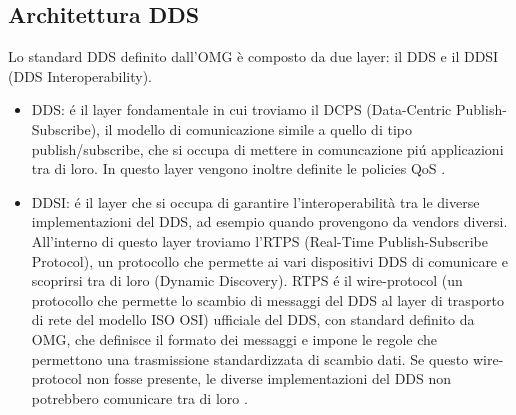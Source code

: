 \subsection{Architettura DDS}
Lo standard DDS definito dall'OMG è composto da due layer: 
il DDS e il
DDSI (DDS Interoperability).
    \begin{itemize}
        \item DDS: é il layer fondamentale in cui troviamo il DCPS
        (Data-Centric Publish-Subscribe),
        il modello di comunicazione simile a quello di tipo publish/subscribe,
        che si occupa di mettere in comuncazione piú applicazioni 
        tra di loro. In questo layer vengono inoltre 
        definite le policies QoS \cite{Michaud2017Apr}.
        \item DDSI: é il layer che si occupa di garantire l'interoperabilità
        tra le diverse implementazioni del DDS, ad
        esempio quando provengono da vendors diversi.
        All'interno di questo layer troviamo l'RTPS 
        (Real-Time Publish-Subscribe Protocol), un protocollo che permette ai 
        vari dispositivi DDS di comunicare e scoprirsi tra di loro
        (Dynamic Discovery).
        RTPS é il wire-protocol (un protocollo che permette lo scambio di 
        messaggi del DDS al layer di trasporto di rete 
        del modello ISO OSI) ufficiale del DDS, 
        con standard definito da OMG,
        che definisce il formato dei messaggi e impone le regole che 
        permettono una trasmissione standardizzata di scambio dati. 
        Se questo wire-protocol non fosse presente,
        le diverse implementazioni del DDS non potrebbero 
        comunicare tra di loro \cite{essay93639}.
    \end{itemize} 











